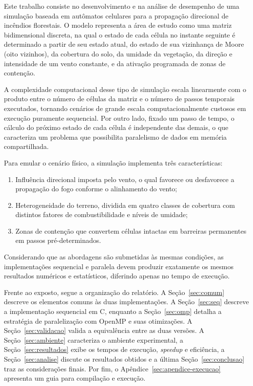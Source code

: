 \documentclass[11pt,a4paper]{article}
\begin{document}
Este trabalho consiste no desenvolvimento e na análise de desempenho de uma simulação baseada em autômatos celulares para a propagação direcional de incêndios florestais. O modelo representa a área de estudo como uma matriz bidimensional discreta, na qual o estado de cada célula no instante seguinte é determinado a partir de seu estado atual, do estado de sua vizinhança de Moore (oito vizinhos), da cobertura do solo, da umidade da vegetação, da direção e intensidade de um vento constante, e da ativação programada de zonas de contenção.

A complexidade computacional desse tipo de simulação escala linearmente com o produto entre o número de células da matriz e o número de passos temporais executados, tornando cenários de grande escala computacionalmente custosos em execução puramente sequencial. Por outro lado, fixado um passo de tempo, o cálculo do próximo estado de cada célula é independente das demais, o que caracteriza um problema que possibilita paralelismo de dados em memória compartilhada.

Para emular o cenário físico, a simulação implementa três características:

\begin{enumerate}[label=(\roman*)]
    \item Influência direcional imposta pelo vento, o qual favorece ou desfavorece a propagação do fogo conforme o alinhamento do vento;
    \item Heterogeneidade do terreno, dividida em quatro classes de cobertura com distintos fatores de combustibilidade e níveis de umidade;
    \item Zonas de contenção que convertem células intactas em barreiras permanentes em passos pré-determinados.
\end{enumerate}

Considerando que as abordagens são submetidas às mesmas condições, as implementações sequencial e paralela devem produzir exatamente os mesmos resultados numéricos e estatísticos, diferindo apenas no tempo de execução.

Frente ao exposto, segue a organização do relatório. A Seção~\ref{sec:comum} descreve os elementos comuns às duas implementações. A Seção~\ref{sec:seq} descreve a implementação sequencial em C, enquanto a Seção~\ref{sec:omp} detalha a estratégia de paralelização com OpenMP e suas otimizações. A Seção~\ref{sec:validacao} valida a equivalência entre as duas versões. A Seção~\ref{sec:ambiente} caracteriza o ambiente experimental, a Seção~\ref{sec:resultados} exibe os tempos de execução, \emph{speedup} e eficiência, a Seção~\ref{sec:analise} discute os resultados obtidos e a última Seção~\ref{sec:conclusao} traz as considerações finais. Por fim, o Apêndice~\ref{sec:apendice-execucao} apresenta um guia para compilação e execução.
\end{document}
